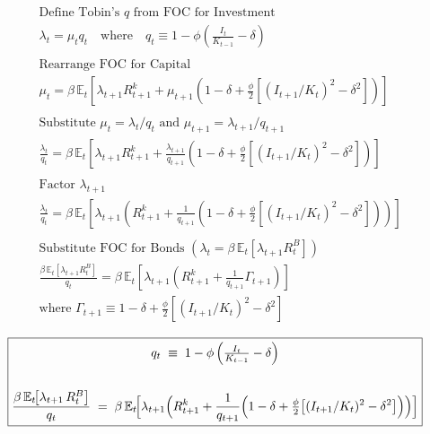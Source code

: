 \documentclass[11pt,preprint]{elsarticle}
\numberwithin{equation}{section}
\numberwithin{figure}{section}
\numberwithin{table}{section}
\begin{document}
\begin{align*}
& \text{Define Tobin's } q \text{ from FOC for Investment} \\
& \lambda_t = \mu_t q_t \quad \text{where} \quad q_t \equiv 1 - \phi\left(\tfrac{I_t}{K_{t-1}} - \delta\right) \\
& \\
& \text{Rearrange FOC for Capital} \\
& \mu_t = \beta\,\mathbb{E}_t\!\left[ \lambda_{t+1}R_{t+1}^k + \mu_{t+1}\!\left(1-\delta + \tfrac{\phi}{2}\left[(I_{t+1}/K_t)^2 - \delta^2\right]\right) \right] \\
& \\
& \text{Substitute } \mu_t = \lambda_t / q_t \text{ and } \mu_{t+1} = \lambda_{t+1} / q_{t+1} \\
& \frac{\lambda_t}{q_t} = \beta\,\mathbb{E}_t\!\left[ \lambda_{t+1}R_{t+1}^k + \frac{\lambda_{t+1}}{q_{t+1}}\left(1-\delta + \tfrac{\phi}{2}\left[(I_{t+1}/K_t)^2 - \delta^2\right]\right) \right] \\
& \\
& \text{Factor } \lambda_{t+1} \\
& \frac{\lambda_t}{q_t} = \beta\,\mathbb{E}_t\!\left[ \lambda_{t+1} \left( R_{t+1}^k + \frac{1}{q_{t+1}}\left(1-\delta + \tfrac{\phi}{2}\left[(I_{t+1}/K_t)^2 - \delta^2\right]\right) \right) \right] \\
& \\
& \text{Substitute FOC for Bonds } (\lambda_t = \beta\,\mathbb{E}_t[\lambda_{t+1}R_t^B]) \\
& \frac{\beta\,\mathbb{E}_t[\lambda_{t+1}R_t^B]}{q_t} = \beta\,\mathbb{E}_t\!\left[ \lambda_{t+1} \left( R_{t+1}^k + \frac{1}{q_{t+1}}\Gamma_{t+1} \right) \right] \\
& \text{where } \Gamma_{t+1} \equiv 1-\delta + \tfrac{\phi}{2}\left[(I_{t+1}/K_t)^2 - \delta^2\right]
\end{align*}

\begin{equation}\label{capital_euler_app}
\boxed{
  \begin{gathered}
  q_t \;\equiv\; 1 - \phi\,\Bigl(\tfrac{I_t}{K_{t-1}} - \delta\Bigr) \\
  \\
  \frac{\beta\,\mathbb{E}_t\!\bigl[\lambda_{t+1}\,R_t^B\bigr]}{q_t}
  \;=\;
  \beta\,\mathbb{E}_t\!\Bigl[
    \lambda_{t+1}\Bigl(
      R_{t+1}^k
      + \frac{1}{q_{t+1}}
        \Bigl(
          1 - \delta
          + \tfrac{\phi}{2}\bigl[(I_{t+1}/K_t)^2 - \delta^2\bigr]
        \Bigr)
    \Bigr)
  \Bigr]
  \end{gathered}
}
\end{equation}
\end{document}
